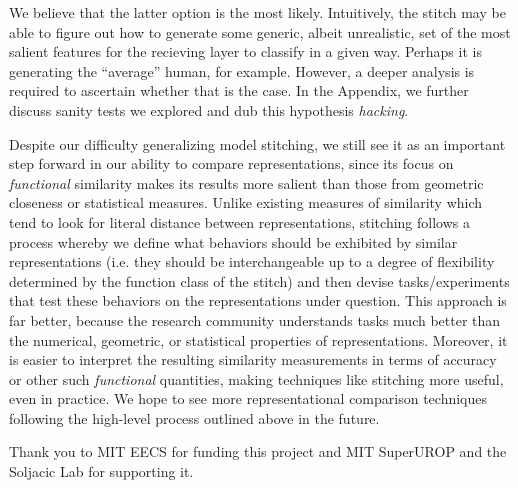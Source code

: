 \documentclass{article}
\begin{document}
We believe that the latter option is the most likely. Intuitively, the stitch may be able to figure out how to
generate some generic, albeit unrealistic, set of the most salient features for the recieving layer to classify
in a given way. Perhaps it is generating the ``average'' human, for example. However, a deeper analysis is required
to ascertain whether that is the case. In the Appendix, we further discuss sanity tests we explored and dub this
hypothesis \textit{hacking}.

Despite our difficulty generalizing model stitching, we still see it as an important
step forward in our ability to compare representations, since its focus on
\textit{functional} similarity makes its results more salient than those from
geometric closeness or statistical measures. Unlike existing measures of similarity which
tend to look for literal distance between representations, stitching follows a process whereby
we define what behaviors should be exhibited by similar representations (i.e. they should
be interchangeable up to a degree of flexibility determined by the function class of the stitch)
and then devise tasks/experiments that test these behaviors on the representations under question.
This approach is far better, because the research community understands tasks much better than
the numerical, geometric, or statistical properties of representations. Moreover, it is
easier to interpret the resulting similarity measurements in terms of accuracy or other such
\textit{functional} quantities, making techniques like stitching more useful, even in practice.
We hope to see more
representational comparison techniques following the high-level process outlined above in the future.

\begin{ack}
Thank you to MIT EECS for funding this project and MIT SuperUROP and the Soljacic Lab for supporting it.
\end{ack}
\end{document}

